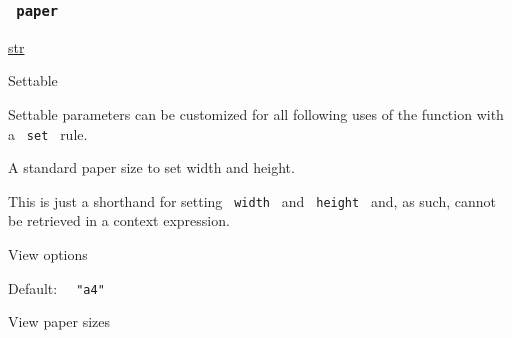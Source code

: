 \subsubsection{\texorpdfstring{\texttt{\ paper\ }}{ paper }}\label{parameters-paper}

\href{/docs/reference/foundations/str/}{str}

{{ Settable }}

\label{parameters-paper-settable-tooltip}
Settable parameters can be customized for all following uses of the
function with a \texttt{\ set\ } rule.

A standard paper size to set width and height.

This is just a shorthand for setting \texttt{\ width\ } and
\texttt{\ height\ } and, as such, cannot be retrieved in a context
expression.


View options

Default: \texttt{\ }{\texttt{\ "a4"\ }}\texttt{\ }


View paper sizes

